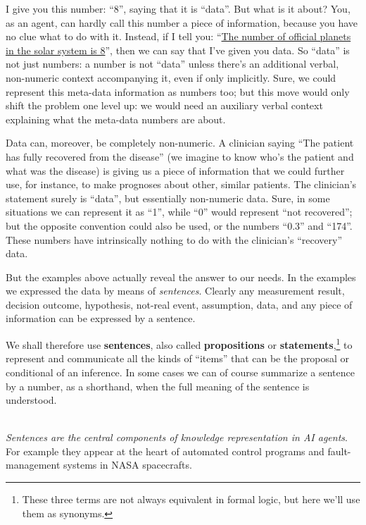 \documentclass[
  a4paper,
  DIV=11,
  numbers=noendperiod,
  oneside]{scrreprt}
\begin{document}
I give you this number: {``\(8\)'',} saying that it is ``data''. But
what is it about? You, as an agent, can hardly call this number a piece
of information, because you have no clue what to do with it. Instead, if
I tell you: ``\href{https://solarsystem.nasa.gov/planets/overview}{The
number of official planets in the solar system is 8}'', then we can say
that I've given you data. So ``data'' is not just numbers: a number is
not ``data'' unless there's an additional verbal, non-numeric context
accompanying it, even if only implicitly. Sure, we could represent this
meta-data information as numbers too; but this move would only shift the
problem one level up: we would need an auxiliary verbal context
explaining what the meta-data numbers are about.

Data can, moreover, be completely non-numeric. A clinician saying ``The
patient has fully recovered from the disease'' (we imagine to know who's
the patient and what was the disease) is giving us a piece of
information that we could further use, for instance, to make prognoses
about other, similar patients. The clinician's statement surely is
``data'', but essentially non-numeric data. Sure, in some situations we
can represent it as ``1'', while ``0'' would represent ``not
recovered''; but the opposite convention could also be used, or the
numbers ``0.3'' and ``174''. These numbers have intrinsically nothing to
do with the clinician's ``recovery'' data.

But the examples above actually reveal the answer to our needs. In the
examples we expressed the data by means of \emph{sentences}. Clearly any
measurement result, decision outcome, hypothesis, not-real event,
assumption, data, and any piece of information can be expressed by a
sentence.

We shall therefore use {\textbf{sentences}}, also called
{\textbf{propositions}} or \textbf{statements},\footnote{These three
  terms are not always equivalent in formal logic, but here we'll use
  them as synonyms.} to represent and communicate all the kinds of
``items'' that can be the proposal or conditional of an inference. In
some cases we can of course summarize a sentence by a number, as a
shorthand, when the full meaning of the sentence is understood.\\
\strut \\

\emph{Sentences are the central components of knowledge representation
in AI agents}. For example they appear at the heart of automated control
programs and fault-management systems in NASA spacecrafts.
\end{document}
